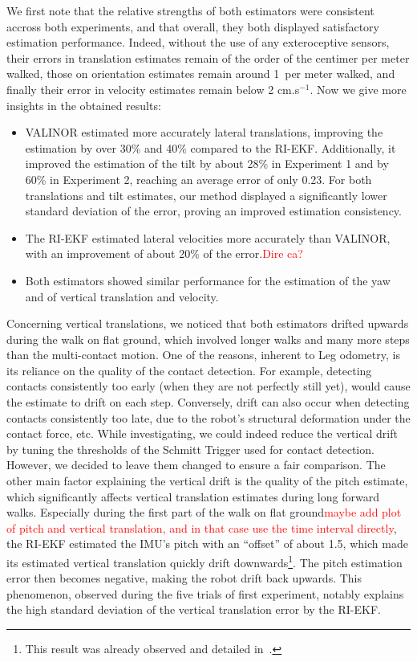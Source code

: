 \documentclass{IJCAS}
\begin{document}
We first note that the relative strengths of both estimators were consistent accross both experiments, and that overall, they both displayed satisfactory estimation performance. Indeed, without the use of any exteroceptive sensors, their errors in translation estimates remain of the order of the centimer per meter walked, those on orientation estimates remain around 1\textdegree \ per meter walked, and finally their error in velocity estimates remain below 2 cm.s$^{-1}$. Now we give more insights in the obtained results:
\begin{itemize}
    \item VALINOR estimated more accurately lateral translations, improving the estimation by over 30\% and 40\% compared to the RI-EKF. Additionally, it improved the estimation of the tilt by about 28\% in Experiment 1 and by 60\% in Experiment 2, reaching an average error of only 0.23\textdegree. For both translations and tilt estimates, our method displayed a significantly lower standard deviation of the error, proving an improved estimation consistency. 
    \item The RI-EKF estimated lateral velocities more accurately than VALINOR, with an improvement of about 20\% of the error.\textcolor{red}{Dire ca?}
    \item Both estimators showed similar performance for the estimation of the yaw and of vertical translation and velocity.
\end{itemize}

Concerning vertical translations, we noticed that both estimators drifted upwards during the walk on flat ground, which involved longer walks and many more steps than the multi-contact motion. One of the reasons, inherent to Leg odometry, is its reliance on the quality of the contact detection. For example, detecting contacts consistently too early (when they are not perfectly still yet), would cause the estimate to drift on each step. Conversely, drift can also occur when detecting contacts consistently too late, due to the robot's structural deformation under the contact force, etc. While investigating, we could indeed reduce the vertical drift by tuning the thresholds of the Schmitt Trigger used for contact detection. However, we decided to leave them changed to ensure a fair comparison. The other main factor explaining the vertical drift is the quality of the pitch estimate, which significantly affects vertical translation estimates during long forward walks. Especially during the first part of the walk on flat ground\textcolor{red}{maybe add plot of pitch and vertical translation, and in that case use the time interval directly}, the RI-EKF estimated the IMU's pitch with an ``offset'' of about 1.5\textdegree, which made its estimated vertical translation quickly drift downwards\footnote{This result was already observed and detailed in~\cite{Demont2024KineticsObserver}.}.
The pitch estimation error then becomes negative, making the robot drift back upwards. This phenomenon, observed during the five trials of first experiment, notably explains the high standard deviation of the vertical translation error by the RI-EKF.
\end{document}
